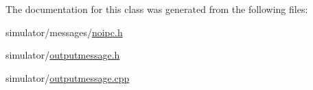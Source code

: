 The documentation for this class was generated from the following files\+:\begin{DoxyCompactItemize}
\item 
simulator/messages/\mbox{\hyperlink{noipc_8h}{noipc.\+h}}\item 
simulator/\mbox{\hyperlink{outputmessage_8h}{outputmessage.\+h}}\item 
simulator/\mbox{\hyperlink{outputmessage_8cpp}{outputmessage.\+cpp}}\end{DoxyCompactItemize}

